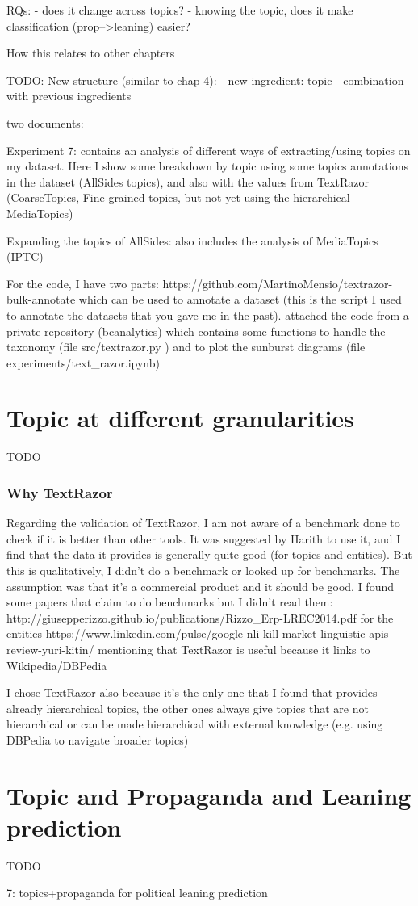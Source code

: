 \label{chap:topics}


RQs:
- does it change across topics?
- knowing the topic, does it make classification (prop-->leaning) easier?

How this relates to other chapters


TODO: New structure (similar to chap 4):
- new ingredient: topic
- combination with previous ingredients


two documents:

Experiment 7: contains an analysis of different ways of extracting/using topics on my dataset. Here I show some breakdown by topic using some topics annotations in the dataset (AllSides topics), and also with the values from TextRazor (CoarseTopics, Fine-grained topics, but not yet using the hierarchical MediaTopics)

Expanding the topics of AllSides: also includes the analysis of MediaTopics (IPTC)


For the code, I have two parts:
https://github.com/MartinoMensio/textrazor-bulk-annotate which can be used to annotate a dataset (this is the script I used to annotate the datasets that you gave me in the past).
attached the code from a private repository (bcanalytics) which contains some functions to handle the taxonomy (file src/textrazor.py ) and to plot the sunburst diagrams (file experiments/text\_razor.ipynb)

\section{Topic at different granularities}

TODO

\subsubsection{Why TextRazor}
Regarding the validation of TextRazor, I am not aware of a benchmark done to check if it is better than other tools. It was suggested by Harith to use it, and I find that the data it provides is generally quite good (for topics and entities). But this is qualitatively, I didn’t do a benchmark or looked up for benchmarks. The assumption was that it’s a commercial product and it should be good.
I found some papers that claim to do benchmarks but I didn’t read them:
http://giusepperizzo.github.io/publications/Rizzo\_Erp-LREC2014.pdf for the entities
https://www.linkedin.com/pulse/google-nli-kill-market-linguistic-apis-review-yuri-kitin/ mentioning that TextRazor is useful because it links to Wikipedia/DBPedia

I chose TextRazor also because it’s the only one that I found that provides already hierarchical topics, the other ones always give topics that are not hierarchical or can be made hierarchical with external knowledge (e.g. using DBPedia to navigate broader topics)

\section{Topic and Propaganda and Leaning prediction}

TODO

7: topics+propaganda for political leaning prediction